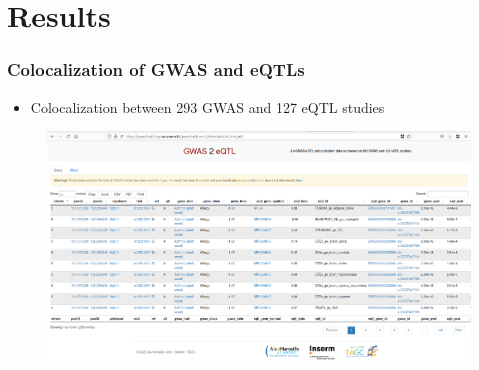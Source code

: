 \documentclass{beamer}
\begin{document}
    \section{Results}

    \begin{frame}
        \frametitle{Colocalization of GWAS and eQTLs}


        \begin{itemize}
            \item Colocalization between 293 GWAS and 127 eQTL studies
        \end{itemize}

        \begin{figure}[!]
            \includegraphics[width=\textwidth]{fig/web_portal.png}\label{fig:coloc_web}
        \end{figure}

    \end{frame}
\end{document}
